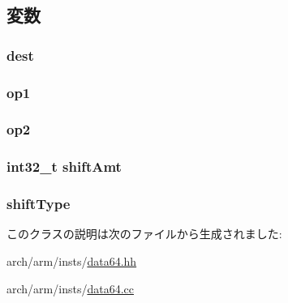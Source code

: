 \subsection{変数}
\hypertarget{classArmISA_1_1DataXSRegOp_aec72e8e45bdc87abeeeb75d2a8a9a716}{
\subsubsection[{dest}]{ {\bf dest}}}
\label{classArmISA_1_1DataXSRegOp_aec72e8e45bdc87abeeeb75d2a8a9a716}
\hypertarget{classArmISA_1_1DataXSRegOp_a4c465c43ad568f8bcf8ae71480e9cfea}{
\subsubsection[{op1}]{ {\bf op1}}}
\label{classArmISA_1_1DataXSRegOp_a4c465c43ad568f8bcf8ae71480e9cfea}
\hypertarget{classArmISA_1_1DataXSRegOp_a7799ff6cbe5a252199059eb8665820e7}{
\subsubsection[{op2}]{ {\bf op2}}}
\label{classArmISA_1_1DataXSRegOp_a7799ff6cbe5a252199059eb8665820e7}
\hypertarget{classArmISA_1_1DataXSRegOp_a378dfadeb317c390962c147be928d92d}{
\subsubsection[{shiftAmt}]{\setlength{\rightskip}{0pt plus 5cm}int32\_\-t {\bf shiftAmt}}}
\label{classArmISA_1_1DataXSRegOp_a378dfadeb317c390962c147be928d92d}
\hypertarget{classArmISA_1_1DataXSRegOp_ae5b7df4bd366c5419743bf5f679485b9}{
\subsubsection[{shiftType}]{ {\bf shiftType}}}
\label{classArmISA_1_1DataXSRegOp_ae5b7df4bd366c5419743bf5f679485b9}


このクラスの説明は次のファイルから生成されました:\begin{DoxyCompactItemize}
\item 
arch/arm/insts/\hyperlink{data64_8hh}{data64.hh}\item 
arch/arm/insts/\hyperlink{data64_8cc}{data64.cc}\end{DoxyCompactItemize}
